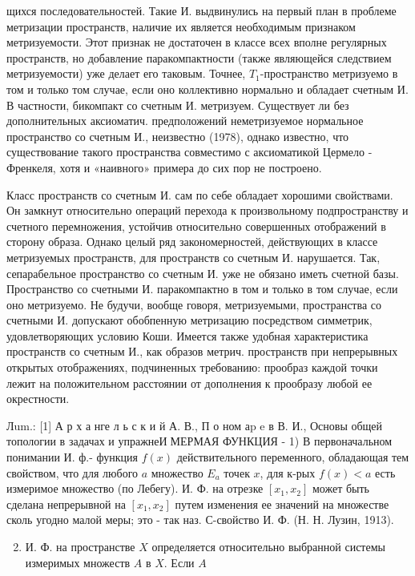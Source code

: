 \documentclass[10pt]{article}
\begin{document}
щихся последовательностей. Такие И. выдвинулись на первый план в проблеме метризации пространств, наличие их является необходимым признаком метризуемости. Этот признак не достаточен в классе всех вполне регулярных пространств, но добавление паракомпактности (также являющейся следствием метризуемости) уже делает его таковым. Точнее, $T_{1}$-пространство метризуемо в том и только том случае, если оно коллективно нормально и обладает счетным И. В частности, бикомпакт со счетным И. метризуем. Существует ли без дополнительных аксиоматич. предположений неметризуемое нормальное пространство со счетным И., неизвестно (1978), однако известно, что существование такого пространства совместимо с аксиоматикой Цермело - Френкеля, хотя и «наивного» примера до сих пор не построено.



Класс пространств со счетным И. сам по себе обладает хорошими свойствами. Он замкнут относительно операций перехода к произвольному подпространству и счетного перемножения, устойчив относительно совершенных отображений в сторону образа. Однако целый ряд закономерностей, действующих в классе метризуемых пространств, для пространств со счетным И. нарушается. Так, сепарабельное пространство со счетным И. уже не обязано иметь счетной базы. Пространство со счетными И. паракомпактно в том и только в том случае, если оно метризуемо. Не будучи, вообще говоря, метризуемыми, пространства со счетными И. допускают обобпенную метризацию посредством симметрик, удовлетворяющих условию Коши. Имеется также удобная характеристика пространств со счетным И., как образов метрич. пространств при непрерывных открытых отображениях, подчиненных требованию: прообраз каждой точки лежит на положительном расстоянии от дополнения к прообразу любой ее окрестности.



Лum.: [1] А р х а нге л ь с к и й А. В., П о ном аp e в В. И., Основы общей топологии в задачах и упражнеИЗ゙МЕРМАЯ ФУНКЦИЯ - 1) В первоначальном понимании И. ф.- функция $f(x)$ действительного переменного, обладающая тем свойством, что для любого $a$ множество $E_{a}$ точек $x$, для к-рых $f(x)<a$ есть измеримое множество (по Лебегу). И. Ф. на отрезке $\left[x_{1}, x_{2}\right]$ может быть сделана непрерывной на $\left[x_{1}, x_{2}\right]$ путем изменения ее значений на множестве сколь угодно малой меры; это - так наз. $С$-свойство И. Ф. (Н. Н. Лузин, 1913).



\begin{enumerate}

  \setcounter{enumi}{1}

  \item И. Ф. на пространстве $X$ определяется относительно выбранной системы измеримых множеств $A$ в $X$. Если $A$

\end{enumerate}
\end{document}
